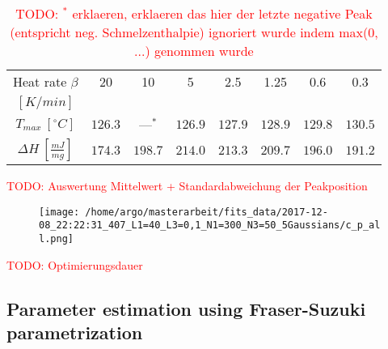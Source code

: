 \documentclass{scrartcl}[12pt, halfparskip]
\numberwithin{equation}{section}
\numberwithin{figure}{section}
\numberwithin{table}{section}
\newcommand{\todo}[1]{\textcolor{red}{TODO: #1}}
\begin{document}
\begin{table}[H]
	\centering
	\begin{tabular}{| c | c | c | c | c | c | c | c |} \hline
		Heat rate $\beta$ & 20 & 10 & 5 & 2.5 & 1.25 & 0.6 & 0.3 \\
		$[K/min]$ & & & & & & & \\ \hline
		$T_{max} \ [^{\circ}C]$ & $126.3$ & ---$^*$ & $126.9$ & $127.9$ & $128.9$ & $129.8$ & $130.5$ \\
		$\Delta H \ [\frac{mJ}{mg}]$ & $174.3$ & $198.7$ & $214.0$ & $213.3$ & $209.7$ & $196.0$ & $191.2$ \\ \hline
	\end{tabular}
	\caption{\todo{$^*$ erklaeren, erklaeren das hier der letzte negative Peak (entspricht neg. Schmelzenthalpie) ignoriert wurde indem max(0, ...) genommen wurde } }
	\label{fig:eval_table_Tmax_deltaH_5Gaussians}
\end{table}

\todo{Auswertung Mittelwert + Standardabweichung der Peakposition}

\begin{figure}[H]
	\centering
	\texttt{[image: /home/argo/masterarbeit/fits\_data/2017-12-08\_22:22:31\_407\_L1=40\_L3=0,1\_N1=300\_N3=50\_5Gaussians/c\_p\_all.png]}
	\caption{}
	\label{fig:5Gaussians_all_c_p}
\end{figure}


\todo{Optimierungsdauer}


\subsection{Parameter estimation using Fraser-Suzuki parametrization}
\label{sec:param_estimation_fs}
\end{document}
